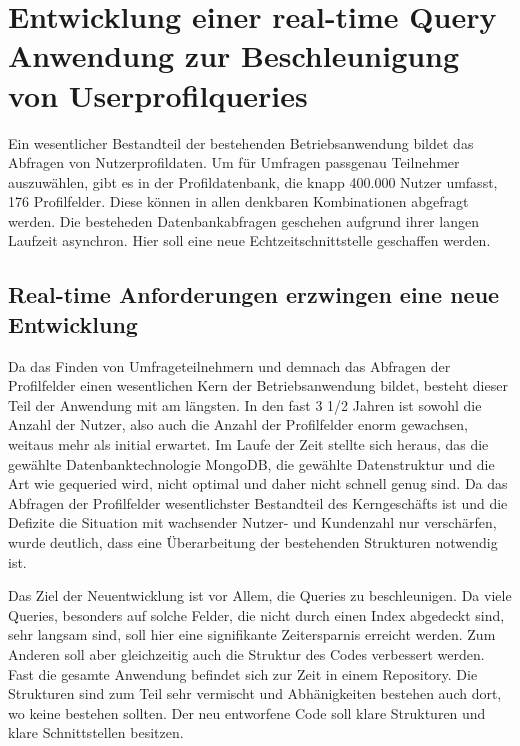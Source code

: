\chapter{Entwicklung einer real-time Query Anwendung zur Beschleunigung von Userprofilqueries}
Ein wesentlicher Bestandteil der bestehenden Betriebsanwendung bildet das Abfragen von Nutzerprofildaten. Um für Umfragen passgenau Teilnehmer auszuwählen, gibt es in der Profildatenbank, die knapp 400.000 Nutzer umfasst, 176 Profilfelder. Diese können in allen denkbaren Kombinationen abgefragt werden. Die besteheden Datenbankabfragen geschehen aufgrund ihrer langen Laufzeit asynchron. Hier soll eine neue Echtzeitschnittstelle geschaffen werden.

\section{Real-time Anforderungen erzwingen eine neue Entwicklung}
Da das Finden von Umfrageteilnehmern und demnach das Abfragen der Profilfelder einen wesentlichen Kern der Betriebsanwendung bildet, besteht dieser Teil der Anwendung mit am längsten. In den fast 3 1/2 Jahren ist sowohl die Anzahl der Nutzer, also auch die Anzahl der Profilfelder enorm gewachsen, weitaus mehr als initial erwartet. Im Laufe der Zeit stellte sich heraus, das die gewählte Datenbanktechnologie MongoDB, die gewählte Datenstruktur und die Art wie gequeried wird, nicht optimal und daher nicht schnell genug sind. Da das Abfragen der Profilfelder wesentlichster Bestandteil des Kerngeschäfts ist und die Defizite die Situation mit wachsender Nutzer- und Kundenzahl nur verschärfen, wurde deutlich, dass eine Überarbeitung der bestehenden Strukturen notwendig ist.

Das Ziel der Neuentwicklung ist vor Allem, die Queries zu beschleunigen. Da viele Queries, besonders auf solche Felder, die nicht durch einen Index abgedeckt sind, sehr langsam sind, soll hier eine signifikante Zeitersparnis erreicht werden. Zum Anderen soll aber gleichzeitig auch die Struktur des Codes verbessert werden. Fast die gesamte Anwendung befindet sich zur Zeit in einem Repository. Die Strukturen sind zum Teil sehr vermischt und Abhänigkeiten bestehen auch dort, wo keine bestehen sollten. Der neu entworfene Code soll klare Strukturen und klare Schnittstellen besitzen.

